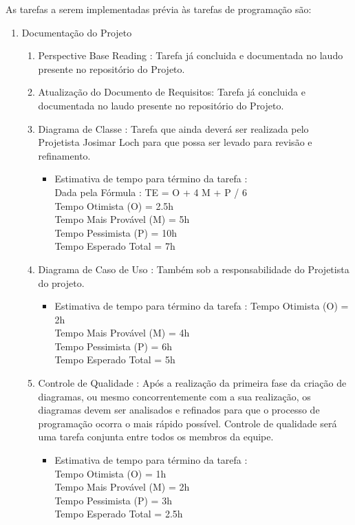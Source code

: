 \documentclass[12pt,a4paper,final]{report}
\begin{document}
\newpage
As tarefas a serem implementadas prévia às tarefas de programação são:

\begin{enumerate}
\item Documentação do Projeto
\begin{enumerate}

\item Perspective Base Reading : Tarefa já concluida e documentada no laudo presente no repositório do Projeto.

\item Atualização do Documento de Requisitos: Tarefa já concluida e documentada no laudo presente no repositório do Projeto.

\item Diagrama de Classe : Tarefa que ainda deverá ser realizada pelo Projetista Josimar Loch para que possa ser levado para revisão e refinamento.
\begin{itemize}
\item Estimativa de tempo para término da tarefa : \\
Dada pela Fórmula : TE = O + 4 M + P / 6\\
Tempo Otimista (O) = 2.5h\\
Tempo Mais Provável (M) = 5h\\
Tempo Pessimista (P) = 10h\\
Tempo Esperado Total = 7h
\end{itemize} 

\item Diagrama de Caso de Uso : Também sob a responsabilidade do Projetista do projeto.
\begin{itemize}
\item Estimativa de tempo para término da tarefa : 
Tempo Otimista (O) = 2h\\
Tempo Mais Provável (M) = 4h\\
Tempo Pessimista (P) = 6h\\
Tempo Esperado Total = 5h
\end{itemize} 

\item Controle de Qualidade : Após a realização da primeira fase da criação de diagramas, ou mesmo concorrentemente com a sua realização, os diagramas devem ser analisados e refinados para que o processo de programação ocorra o mais rápido possível. Controle de qualidade será uma tarefa conjunta entre todos os membros da equipe.
\begin{itemize}
\item Estimativa de tempo para término da tarefa :\\
Tempo Otimista (O) = 1h\\
Tempo Mais Provável (M) = 2h\\
Tempo Pessimista (P) = 3h\\
Tempo Esperado Total = 2.5h
\end{itemize} 


\end{enumerate}
\end{enumerate}
\end{document}
